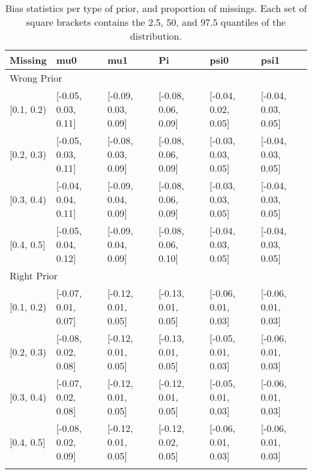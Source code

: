 \begin{table}[ht]
\centering
\begin{tabular}{llllll}
  \toprule
Missing & mu0 & mu1 & Pi & psi0 & psi1 \\ 
  \midrule
\multicolumn{6}{l}{Wrong Prior}\\
{[0.1, 0.2)} & {[-0.05, 0.03, 0.11]} & {[-0.09, 0.03, 0.09]} & {[-0.08, 0.06, 0.09]} & {[-0.04, 0.02, 0.05]} & {[-0.04, 0.03, 0.05]} \\ 
  {[0.2, 0.3)} & {[-0.05, 0.03, 0.11]} & {[-0.08, 0.03, 0.09]} & {[-0.08, 0.06, 0.09]} & {[-0.03, 0.03, 0.05]} & {[-0.04, 0.03, 0.05]} \\ 
  {[0.3, 0.4)} & {[-0.04, 0.04, 0.11]} & {[-0.09, 0.04, 0.09]} & {[-0.08, 0.06, 0.09]} & {[-0.03, 0.03, 0.05]} & {[-0.04, 0.03, 0.05]} \\ 
  {[0.4, 0.5]} & {[-0.05, 0.04, 0.12]} & {[-0.09, 0.04, 0.09]} & {[-0.08, 0.06, 0.10]} & {[-0.04, 0.03, 0.05]} & {[-0.04, 0.03, 0.05]} \\ 
   \midrule
\multicolumn{6}{l}{Right Prior}\\
{[0.1, 0.2)} & {[-0.07, 0.01, 0.07]} & {[-0.12, 0.01, 0.05]} & {[-0.13, 0.01, 0.05]} & {[-0.06, 0.01, 0.03]} & {[-0.06, 0.01, 0.03]} \\ 
  {[0.2, 0.3)} & {[-0.08, 0.02, 0.08]} & {[-0.12, 0.01, 0.05]} & {[-0.13, 0.01, 0.05]} & {[-0.05, 0.01, 0.03]} & {[-0.06, 0.01, 0.03]} \\ 
  {[0.3, 0.4)} & {[-0.07, 0.02, 0.08]} & {[-0.12, 0.01, 0.05]} & {[-0.12, 0.01, 0.05]} & {[-0.05, 0.01, 0.03]} & {[-0.06, 0.01, 0.03]} \\ 
  {[0.4, 0.5]} & {[-0.08, 0.02, 0.09]} & {[-0.12, 0.01, 0.05]} & {[-0.12, 0.02, 0.05]} & {[-0.06, 0.01, 0.03]} & {[-0.06, 0.01, 0.03]} \\ 
   \bottomrule
\multicolumn{6}{l}{}\\
\end{tabular}
\caption{Bias statistics per type of prior, and proportion of missings. Each set of square brackets contains the 2.5, 50, and 97.5 quantiles of the distribution.} 
\label{tab:bias-prior-missigness}
\end{table}
